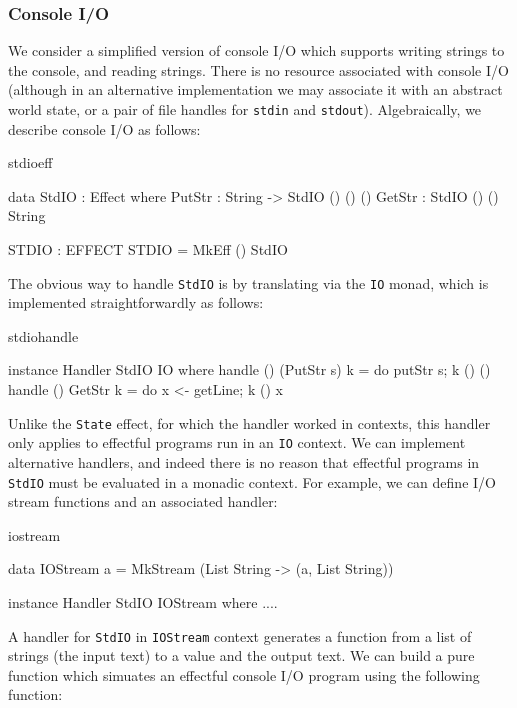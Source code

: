 \subsubsection{Console I/O}

We consider a simplified version of console I/O which supports writing strings
to the console, and reading strings. There is no resource associated with
console I/O (although in an alternative implementation we may associate it
with an abstract world state, or a pair of file handles for \texttt{stdin}
and \texttt{stdout}). Algebraically, we describe console I/O as follows:

\begin{SaveVerbatim}{stdioeff}

data StdIO : Effect where
     PutStr : String -> StdIO () () ()
     GetStr : StdIO () () String

STDIO : EFFECT
STDIO = MkEff () StdIO

\end{SaveVerbatim}

\noindent
The obvious way to handle \texttt{StdIO} is by translating via the \texttt{IO}
monad, which is implemented straightforwardly as follows:

\begin{SaveVerbatim}{stdiohandle}

instance Handler StdIO IO where
    handle () (PutStr s) k = do putStr s; k () ()
    handle () GetStr     k = do x <- getLine; k () x 

\end{SaveVerbatim}

\noindent
Unlike the \texttt{State} effect, for which the handler worked in 
contexts, this handler only applies to effectful programs run in an \texttt{IO}
context. We can implement alternative handlers, and indeed there is no
reason that effectful programs in \texttt{StdIO} must be evaluated in a monadic
context. For example, we can define I/O stream functions and an associated
handler:

\begin{SaveVerbatim}{iostream}

data IOStream a 
   = MkStream (List String -> (a, List String))

instance Handler StdIO IOStream where
    ....

\end{SaveVerbatim}

\noindent
A handler for \texttt{StdIO} in \texttt{IOStream} context generates a function
from a list of strings (the input text) to a value and the output text. We
can build a pure function which simuates an effectful console I/O program
using the following function:

